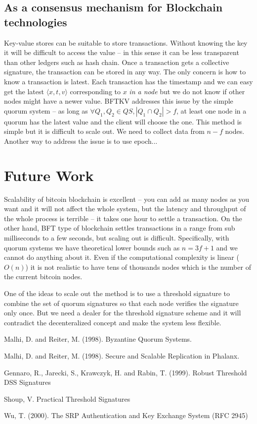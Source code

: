 \documentclass[twoside,twocolumn,10pt,fleqn]{article}
\begin{document}
\subsection{As a consensus mechanism for Blockchain technologies}
Key-value stores can be suitable to store transactions. Without
knowing the key it will be difficult to access the value -- in this
sense it can be less transparent than other ledgers such as hash
chain. Once a transaction gets a collective signature, the transaction
can be stored in any way. The only concern is how to know a
transaction is latest. Each transaction has the timestamp and we can
easy get the latest $\langle x, t, v \rangle$ corresponding to $x$
{\em in a node} but we do not know if other nodes might have a newer
value. BFTKV addresses this issue by the simple quorum system -- as
long as $\forall Q_1, Q_2 \in QS, |Q_1 \cap Q_2| > f$, at least one
node in a quorum has the latest value and the client will choose the
one. This method is simple but it is difficult to scale out. We need
to collect data from $n - f$ nodes. Another way to address the issue
is to use epoch...

\section{Future Work}

Scalability of bitcoin blockchain is excellent -- you can add as many
nodes as you want and it will not affect the whole system, but the
latency and throughput of the whole process is terrible -- it takes
one hour to settle a transaction.
On the other hand, BFT type of blockchain settles transactions in a
range from sub milliseconds to a few seconds, but scaling out is
difficult. Specifically, with quorum systems we have theoretical lower
bounds such as $n = 3f + 1$ and we cannot do anything about it. Even
if the computational complexity is linear ($O(n)$) it is not realistic
to have tens of thousands nodes which is the number of the current
bitcoin nodes. 

One of the ideas to scale out the method is to use a threshold
signature to combine the set of quorum signatures so that each node
verifies the signature only once. But we need a dealer for the
threshold signature scheme and it will contradict the decenteralized
concept and make the system less flexible.

\begin{thebibliography}{99}

  Malhi, D. and Reiter, M. (1998). Byzantine Quorum Systems.

  Malhi, D. and Reiter, M. (1998). Secure and Scalable Replication in Phalanx.

  Gennaro, R., Jarecki, S., Krawczyk, H. and Rabin, T. (1999). Robust
  Threshold DSS Signatures

  Shoup, V. Practical Threshold Signatures
  
  Wu, T. (2000). The SRP Authentication and Key Exchange System (RFC
  2945)

\end{thebibliography}
\end{document}
